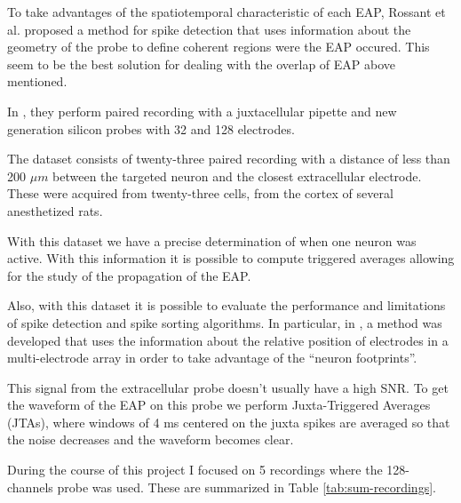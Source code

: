 \documentclass[10pt]{article}
\begin{document}
To take advantages of the spatiotemporal characteristic of each EAP, Rossant et al. \cite{Rossant2016} proposed a method for spike detection that uses information about the geometry of the probe to define coherent regions were the EAP occured. This seem to be the best solution for dealing with the overlap of EAP above mentioned.

In \cite{Netoetal}, they perform paired recording with a juxtacellular pipette and new generation silicon probes with 32 and 128 electrodes. 

The dataset consists of twenty-three paired recording with a distance of less than 200 $\mu m$ between the targeted neuron and the closest extracellular electrode. These were acquired from twenty-three cells, from the cortex of several anesthetized rats.

With this dataset we have a precise determination of when one neuron was active. With this information it is possible to compute triggered averages allowing for the study of the propagation of the EAP.

Also, with this dataset it is possible to evaluate the performance and limitations of spike detection and spike sorting algorithms. In particular, in \cite{Rossant2016}, a method was developed that uses the information about the relative position of electrodes in a multi-electrode array in order to take advantage of the “neuron footprints”.

This signal from the extracellular probe doesn't usually have a high SNR. To get the waveform of the EAP on this probe we perform Juxta-Triggered Averages (JTAs), where windows of 4 ms centered on the juxta spikes are averaged so that the noise decreases and the waveform becomes clear.

During the course of this project I focused on 5 recordings where the 128-channels probe was used. These are summarized in Table \ref{tab:sum-recordings}.
\end{document}
